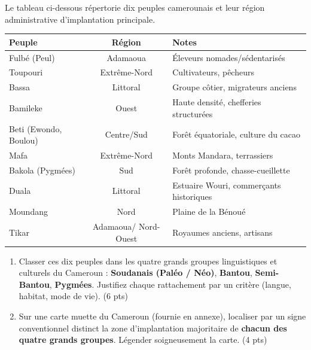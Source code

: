 \documentclass[11pt]{article}
\begin{document}
\begin{exercice}
\label{exo:groupes}
Le tableau ci-dessous répertorie dix peuples camerounais et leur région administrative d'implantation principale.

\begin{center}
\begin{tabular}{|l|c|l|}
\hline
\textbf{Peuple} & \textbf{Région} & \textbf{Notes} \\
\hline
Fulbé (Peul) & Adamaoua & Éleveurs nomades/sédentarisés \\
Toupouri & Extrême-Nord & Cultivateurs, pêcheurs \\
Bassa & Littoral & Groupe côtier, migrateurs anciens \\
Bamileke & Ouest & Haute densité, chefferies structurées \\
Beti (Ewondo, Boulou) & Centre/Sud & Forêt équatoriale, culture du cacao \\
Mafa & Extrême-Nord & Monts Mandara, terrassiers \\
Bakola (Pygmées) & Sud & Forêt profonde, chasse-cueillette \\
Duala & Littoral & Estuaire Wouri, commerçants historiques \\
Moundang & Nord & Plaine de la Bénoué \\
Tikar & Adamaoua/ Nord-Ouest & Royaumes anciens, artisans \\
\hline
\end{tabular}
\end{center}

\begin{enumerate}
    \item Classer ces dix peuples dans les quatre grands groupes linguistiques et culturels du Cameroun : \textbf{Soudanais (Paléo / Néo)}, \textbf{Bantou}, \textbf{Semi-Bantou}, \textbf{Pygmées}. Justifiez chaque rattachement par un critère (langue, habitat, mode de vie). \hfill (6 pts)
    \item Sur une carte muette du Cameroun (fournie en annexe), localiser par un signe conventionnel distinct la zone d'implantation majoritaire de \textbf{chacun des quatre grands groupes}. Légender soigneusement la carte. \hfill (4 pts)
\end{enumerate}
\end{exercice}
\end{document}
